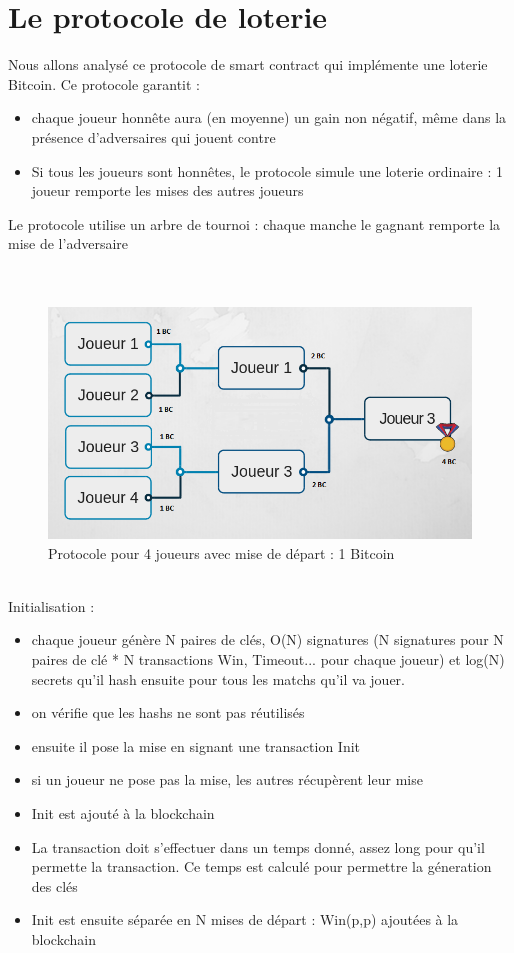 \documentclass[conference]{IEEEtran}
\begin{document}
\section{Le protocole de loterie}
Nous allons analysé ce protocole de smart contract qui implémente une loterie Bitcoin. \cite{955}
Ce protocole garantit :
\begin{itemize}
\item chaque joueur honnête aura (en moyenne) un gain non négatif, même dans la
présence d'adversaires qui jouent contre 
\item Si tous les joueurs sont honnêtes, le protocole simule une loterie ordinaire : 1 joueur remporte les mises des autres joueurs 
\end{itemize}
Le protocole utilise un arbre de tournoi : chaque manche le gagnant remporte la mise de l'adversaire \\
\\ \\
\begin{subfigure}
    \centering
    \includegraphics[scale=0.4]{arbre-tournoi.png}
    \caption{Protocole pour 4 joueurs avec mise de départ : 1 Bitcoin}
    \label{fig:my_label}
\end{subfigure}
\vspace{0.3cm}\\
Initialisation : \\
\begin{itemize}
\item chaque joueur génère N paires de clés, O(N) signatures (N signatures pour N paires de clé * N transactions Win, Timeout... pour chaque joueur) et log(N) secrets qu'il hash ensuite pour tous les matchs qu'il va jouer.
\item on vérifie que les hashs ne sont pas réutilisés
\item ensuite il pose la mise en signant une transaction Init
\item si un joueur ne pose pas la mise, les autres récupèrent leur mise
\item Init est ajouté à la blockchain
\item La transaction doit s'effectuer dans un temps donné, assez long pour qu'il permette la transaction. Ce temps est calculé pour permettre la géneration des clés 
\item Init est ensuite séparée en N mises de départ : Win(p,p) ajoutées à la blockchain \\
\end{itemize}
\\
\end{document}

